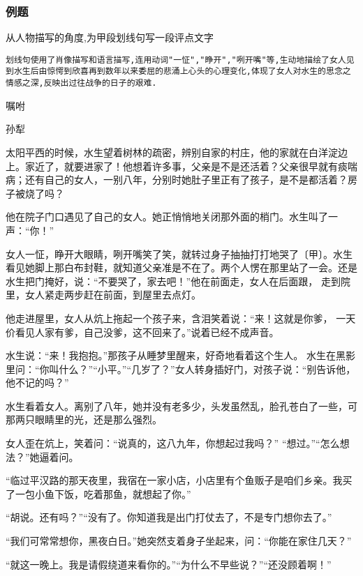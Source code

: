 \documentclass{ctexart}
\newcommand{\nm}{\normalsize}
\begin{document}
\subsubsection{例题}
\large

从人物描写的角度,为甲段划线句写一段评点文字

\texttt{划线句使用了肖像描写和语言描写,连用动词"一怔","睁开","咧开嘴"等,生动地描绘了女人见到水生后由惊愕到欣喜再到数年以来委屈的悲涌上心头的心理变化,体现了女人对水生的思念之情感之深,反映出过往战争的日子的艰难.}

\clearpage
\nm \fangsong

\begin{center}
	嘱咐

	孙犁
\end{center}

太阳平西的时候，水生望着树林的疏密，辨别自家的村庄，他的家就在白洋淀边上。家近了，就要进家了！他想着许多事，父亲是不是还活着？父亲很早就有痰喘病；还有自己的女人，一别八年，分别时她肚子里正有了孩子，是不是都活着？房子被烧了吗？

他在院子门口遇见了自己的女人。她正悄悄地关闭那外面的梢门。水生叫了一声：“你！”

女人一怔，睁开大眼睛，咧开嘴笑了笑，就转过身子抽抽打打地哭了〔甲〕。水生看见她脚上那白布封鞋，就知道父亲准是不在了。两个人愣在那里站了一会。还是水生把门掩好，说：“不要哭了，家去吧！”他在前面走，女人在后面跟， 走到院里，女人紧走两步赶在前面，到屋里去点灯。

他走进屋里，女人从炕上拖起一个孩子来，含泪笑着说：“来！这就是你爹， 一天价看见人家有爹，自己没爹，这不回来了。”说着已经不成声音。

水生说：“来！我抱抱。”那孩子从睡梦里醒来，好奇地看着这个生人。 水生在黑影里问：“你叫什么？”“小平。”“几岁了？”女人转身插好门，对孩子说：“别告诉他，他不记的吗？”

水生看着女人。离别了八年，她并没有老多少，头发虽然乱，脸孔苍白了一些，可那两只眼睛里的光，还是那么强烈。

女人歪在炕上，笑着问：“说真的，这八九年，你想起过我吗？” “想过。”“怎么想法？”她逼着问。

“临过平汉路的那天夜里，我宿在一家小店，小店里有个鱼贩子是咱们乡亲。我买了一包小鱼下饭，吃着那鱼，就想起了你。”

“胡说。还有吗？”“没有了。你知道我是出门打仗去了，不是专门想你去了。”

“我们可常常想你，黑夜白日。”她突然支着身子坐起来，问：“你能在家住几天？”

“就这一晚上。我是请假绕道来看你的。”“为什么不早些说？”“还没顾着啊！”
\end{document}
